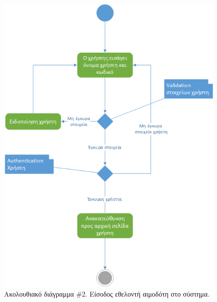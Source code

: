 		
		\begin{figure}[H]
		    \centering
		    \includegraphics[width=1\textwidth]{Login.png}
		    \caption{Ακολουθιακό διάγραμμα \#2. Είσοδος εθελοντή αιμοδότη στο σύστημα.}
		    \label{fig:login}
		\end{figure}
		
